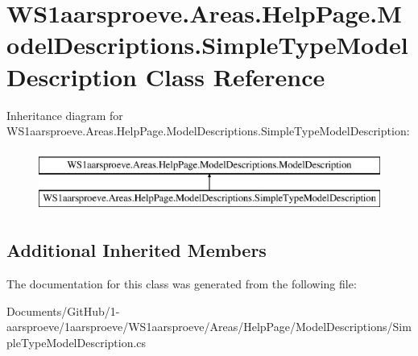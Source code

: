 \hypertarget{class_w_s1aarsproeve_1_1_areas_1_1_help_page_1_1_model_descriptions_1_1_simple_type_model_description}{}\section{W\+S1aarsproeve.\+Areas.\+Help\+Page.\+Model\+Descriptions.\+Simple\+Type\+Model\+Description Class Reference}
\label{class_w_s1aarsproeve_1_1_areas_1_1_help_page_1_1_model_descriptions_1_1_simple_type_model_description}
Inheritance diagram for W\+S1aarsproeve.\+Areas.\+Help\+Page.\+Model\+Descriptions.\+Simple\+Type\+Model\+Description\+:\begin{figure}[H]
\begin{center}
\leavevmode
\includegraphics[height=2.000000cm]{class_w_s1aarsproeve_1_1_areas_1_1_help_page_1_1_model_descriptions_1_1_simple_type_model_description}
\end{center}
\end{figure}
\subsection*{Additional Inherited Members}


The documentation for this class was generated from the following file\+:\begin{DoxyCompactItemize}
\item 
Documents/\+Git\+Hub/1-\/aarsproeve/1aarsproeve/\+W\+S1aarsproeve/\+Areas/\+Help\+Page/\+Model\+Descriptions/Simple\+Type\+Model\+Description.\+cs\end{DoxyCompactItemize}

